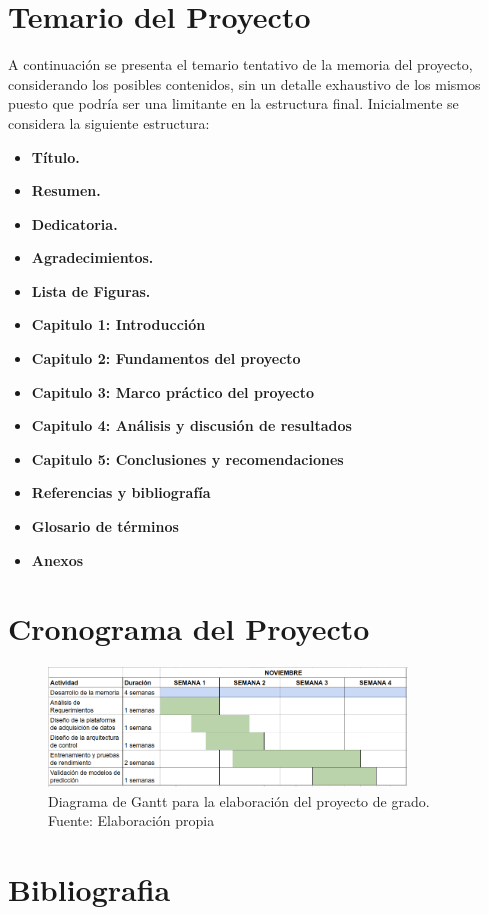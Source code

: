 \documentclass[12pt,letterpaper]{article}
\begin{document}
\section{Temario del Proyecto}
A continuación se presenta el temario tentativo de la memoria del proyecto, 
considerando los posibles contenidos, sin un detalle exhaustivo de los mismos 
puesto que podría ser una limitante en la estructura final. 
Inicialmente se considera la siguiente estructura:\\

\begin{itemize}

\item \textbf{Título.}

\item \textbf{Resumen.}

\item \textbf{Dedicatoria.}

\item \textbf{Agradecimientos.}

\item \textbf{Lista de Figuras.}

\item \textbf{Capitulo 1: Introducción}  

\item \textbf{Capitulo 2: Fundamentos del proyecto}  

\item \textbf{Capitulo 3: Marco práctico del proyecto} 

\item \textbf{Capitulo 4: Análisis y discusión de resultados}

\item \textbf{Capitulo 5: Conclusiones y recomendaciones}

\item \textbf{Referencias y bibliografía}

\item \textbf{Glosario de términos}

\item \textbf{Anexos}
\end{itemize}

\newpage
\section{Cronograma del Proyecto}

\begin{figure}[!ht] 
    \centering
    \includegraphics[width=0.85\textwidth]{img/nuevo_cronograma}
    \caption{Diagrama de Gantt para la elaboración del proyecto de grado. Fuente: Elaboración propia}
    \label{fig:cronograma}
    \end{figure}

\newpage
\section{Bibliografia}



\end{document}
